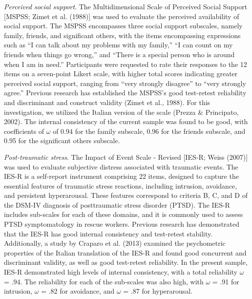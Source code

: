 \documentclass[
  man,floatsintext]{apa7}
\begin{document}
\emph{Perceived social support}. The Multidimensional Scale of Perceived Social Support {[}MSPSS; Zimet et al. (1988){]} was used to evaluate the perceived availability of social support. The MSPSS encompasses three social support subscales, namely family, friends, and significant others, with the items encompassing expressions such as ``I can talk about my problems with my family,'' ``I can count on my friends when things go wrong,'' and ``There is a special person who is around when I am in need.'' Participants were requested to rate their responses to the 12 items on a seven-point Likert scale, with higher total scores indicating greater perceived social support, ranging from ``very strongly disagree'' to ``very strongly agree.'' Previous research has established the MSPSS's good test-retest reliability and discriminant and construct validity (Zimet et al., 1988). For this investigation, we utilized the Italian version of the scale (Prezza \& Principato, 2002). The internal consistency of the current sample was found to be good, with coefficients of \(\omega\) of 0.94 for the family subscale, 0.96 for the friends subscale, and 0.95 for the significant others subscale.

\emph{Post-traumatic stress}. The Impact of Event Scale - Revised {[}IES-R; Weiss (2007){]} was used to evaluate subjective distress associated with traumatic events. The IES-R is a self-report instrument comprising 22 items, designed to capture the essential features of traumatic stress reactions, including intrusion, avoidance, and persistent hyperarousal. These features correspond to criteria B, C, and D of the DSM-IV diagnosis of posttraumatic stress disorder (PTSD). The IES-R includes sub-scales for each of these domains, and it is commonly used to assess PTSD symptomatology in rescue workers. Previous research has demonstrated that the IES-R has good internal consistency and test-retest stability. Additionally, a study by Craparo et al. (2013) examined the psychometric properties of the Italian translation of the IES-R and found good concurrent and discriminant validity, as well as good test-retest reliability.
In the present sample, IES-R demonstrated high levels of internal consistency, with a total reliability \(\omega\) = .94. The reliability for each of the sub-scales was also high, with \(\omega\) = .91 for intrusion, \(\omega\) = .82 for avoidance, and \(\omega\) = .87 for hyperarousal.
\end{document}
